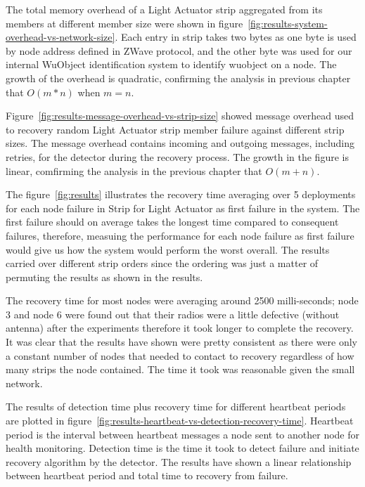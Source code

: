 The total memory overhead of a Light Actuator strip aggregated from its members
at different member size were shown in
figure~\ref{fig:results-system-overhead-vs-network-size}. Each entry in strip
takes two bytes as one byte is used by node address defined in ZWave protocol,
and the other byte was used for our internal WuObject identification system to
identify wuobject on a node. The growth of the overhead is quadratic, confirming
the analysis in previous chapter that $O(m*n)$ when $m = n$. 

Figure~\ref{fig:results-message-overhead-vs-strip-size} showed message overhead
used to recovery random Light Actuator strip member failure against different
strip sizes. The message overhead contains incoming and outgoing messages,
including retries, for the detector during the recovery process. The growth in
the figure is linear, comfirming the analysis in the previous chapter that $O(m+n)$.

The figure~\ref{fig:results} illustrates the recovery time averaging over
5 deployments for each node failure in Strip for Light Actuator as first failure
in the system. The first failure should on average takes the longest time
compared to consequent failures, therefore, measuing the performance for each
node failure as first failure would give us how the system would perform the
worst overall. The results carried over different strip orders since the
ordering was just a matter of permuting the results as shown in the results.

The recovery time for most nodes were averaging around 2500 milli-seconds; node
3 and node 6 were found out that their radios were a little defective (without
antenna) after the experiments therefore it took longer to complete the
recovery. It was clear that the results have shown were pretty consistent as
there were only a constant number of nodes that needed to contact to recovery
regardless of how many strips the node contained. The time it took was
reasonable given the small network. 

The results of detection time plus recovery time for different heartbeat
periods are plotted
in figure~\ref{fig:results-heartbeat-vs-detection-recovery-time}. Heartbeat
period is the interval between heartbeat messages a node sent to
another node for health monitoring. Detection time is the time it took to detect
failure and initiate recovery algorithm by the detector.
The results have shown a linear relationship between heartbeat
period and total time to recovery from failure. 

